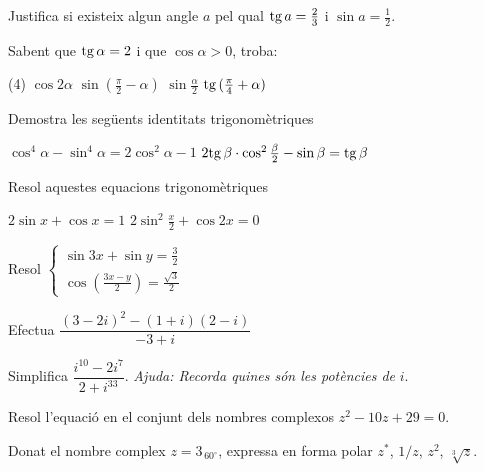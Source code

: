 \begin{mylist}
\exer[2] Justifica si existeix algun angle $a$ pel qual $\mathrm{tg}\, a=\frac{2}{3}$ i $\sin a = \frac{1}{2}$.

\exer[2] Sabent que $\mathrm{tg}\, \alpha= 2$ i que $\cos \alpha>0$, troba:
\begin{tasks}(4)
	\task $\cos 2\alpha$
	\task $\sin(\frac{\pi}{2}-\alpha)$
	\task $\sin \frac{\alpha}{2}$
	\task $\mathrm{tg}\, (\frac{\pi}{4}+\alpha)$
\end{tasks}

\exer[2] Demostra les següents identitats trigonomètriques
\begin{tasks}
	\task $\cos^4 \alpha - \sin^4 \alpha = 2 \cos^2 \alpha -1$
	\task $2 \mathrm{tg}\, \beta \cdot \cos^2 \frac{\beta}{2}-\sin\beta = \mathrm{tg}\, \beta$
\end{tasks}

\exer[2] Resol aquestes equacions trigonomètriques
\begin{tasks}
	\task $2\sin x + \cos x = 1$
	\task $2 \sin^2 \frac{x}{2} + \cos 2x = 0$
\end{tasks}

\exer[2] Resol $\left\{ \begin{array}{l}  
\sin 3x + \sin y = \frac{3}{2} \\ 
\cos \left(  \frac{3x-y}{2} \right) = \frac{\sqrt{3}}{2}
\end{array}\right.$

\exer[2] Efectua $\dfrac{(3-2i)^2 - (1+i)(2-i)}{-3+i}$

\exer[2] Simplifica $\dfrac{i^{10} - 2 i^7}{2 + i^{33}}$. \emph{Ajuda: Recorda quines són les potències de} $i$.

\exer[2] Resol l'equació en el conjunt dels nombres complexos $z^2-10z+29=0$.

\exer[2] Donat el nombre complex $z=3_{\, 60^\circ}$, expressa en forma polar $z^*$, $1/z$, $z^2$, $\sqrt[3]{z}$. 
\end{mylist}

